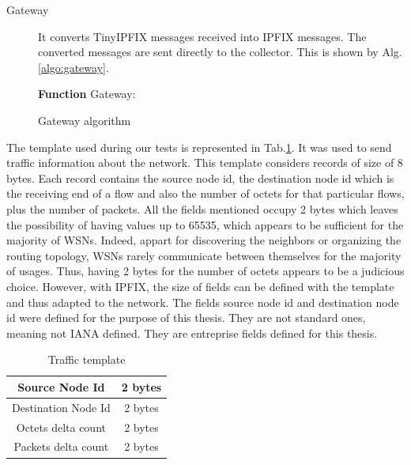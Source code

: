 \begin{description}
  \item[Gateway] It converts TinyIPFIX messages received into IPFIX messages. The converted messages are sent directly to the collector. This is shown by Alg.\ref{algo:gateway}.

  \begin{algorithm}
    \textbf{Function} Gateway:\\
   \caption{Gateway algorithm}
   \label{algo:gateway}
  \end{algorithm}

\end{description}

The template used during our tests is represented in Tab.\ref{table:traffic_template}. It was used to send traffic information about the network. This template considers records of size of 8 bytes. Each record contains the source node id, the destination node id which is the receiving end of a flow and also the number of octets for that particular flows, plus the number of packets. All the fields mentioned occupy 2 bytes which leaves the possibility of having values up to 65535, which appears to be sufficient for the majority of WSNs. Indeed, appart for discovering the neighbors or organizing the routing topology, WSNs rarely communicate between themselves for the majority of usages. Thus, having 2 bytes for the number of octets appears to be a judicious choice. However, with IPFIX, the size of fields can be defined with the template and thus adapted to the network. The fields source node id and destination node id were defined for the purpose of this thesis. They are not standard ones, meaning not IANA defined. They are entreprise fields defined for this thesis.

\begin{table}
  \centering
  \begin{tabular}{|c|c|}
    \hline
    Source Node Id & 2 bytes \\
    \hline
    Destination Node Id & 2 bytes \\
    \hline
    Octets delta count & 2 bytes \\
    \hline
    Packets delta count & 2 bytes \\
    \hline
  \end{tabular}
  \caption{Traffic template}
  \label{table:traffic_template}
\end{table}

